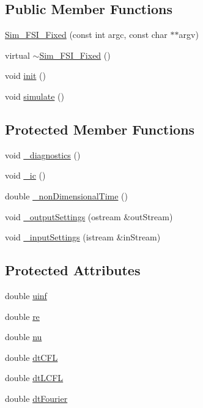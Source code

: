 \subsection*{Public Member Functions}
\begin{DoxyCompactItemize}
\item 
\hyperlink{class_sim___f_s_i___fixed_aafc7f4d24e8753e801d70b9a69b2456c}{Sim\+\_\+\+F\+S\+I\+\_\+\+Fixed} (const int argc, const char $\ast$$\ast$argv)
\item 
virtual \hyperlink{class_sim___f_s_i___fixed_a4e3e80cf9ae0a31cc85a491fc9fc3766}{$\sim$\+Sim\+\_\+\+F\+S\+I\+\_\+\+Fixed} ()
\item 
void \hyperlink{class_sim___f_s_i___fixed_ab5da7ce7b36599b497d8089ad93a99f0}{init} ()
\item 
void \hyperlink{class_sim___f_s_i___fixed_a1e37b29e07ddd05ae1f0c2be321e9bb2}{simulate} ()
\end{DoxyCompactItemize}
\subsection*{Protected Member Functions}
\begin{DoxyCompactItemize}
\item 
void \hyperlink{class_sim___f_s_i___fixed_ac140ab0a939bb401b682fecbf43480a1}{\+\_\+diagnostics} ()
\item 
void \hyperlink{class_sim___f_s_i___fixed_ab30e00522a9a55a6555f3e8cca945899}{\+\_\+ic} ()
\item 
double \hyperlink{class_sim___f_s_i___fixed_a49ae1186409e1430add07864bcb02476}{\+\_\+non\+Dimensional\+Time} ()
\item 
void \hyperlink{class_sim___f_s_i___fixed_a61d404e4b83b3094bf3a6860eff1cb0a}{\+\_\+output\+Settings} (ostream \&out\+Stream)
\item 
void \hyperlink{class_sim___f_s_i___fixed_a71e0c50a736b7ac2b866bf6e163453ae}{\+\_\+input\+Settings} (istream \&in\+Stream)
\end{DoxyCompactItemize}
\subsection*{Protected Attributes}
\begin{DoxyCompactItemize}
\item 
double \hyperlink{class_sim___f_s_i___fixed_adbebdb69690216b89cf81339ac4a5e0e}{uinf}
\item 
double \hyperlink{class_sim___f_s_i___fixed_a439d225a6a3f4dcba00ace7e66adb049}{re}
\item 
double \hyperlink{class_sim___f_s_i___fixed_a309a6019a5f0d5bb2eed40d2afc362e8}{nu}
\item 
double \hyperlink{class_sim___f_s_i___fixed_a501b1373276553911410c679fa282b0d}{dt\+C\+F\+L}
\item 
double \hyperlink{class_sim___f_s_i___fixed_ad3ed1ee2f089552e59b28a9eab2f6cca}{dt\+L\+C\+F\+L}
\item 
double \hyperlink{class_sim___f_s_i___fixed_a5dea9750a2ba748dc420274b88f31f75}{dt\+Fourier}
\end{DoxyCompactItemize}


